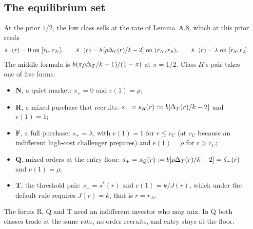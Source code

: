 \subsection{The equilibrium set}

At the prior \(1/2\), the low class sells at the rate of Lemma~A.8, which at this prior reads
\[
\hat s_-(r)=0\ \text{on}\ [r_0,r_N],\qquad \hat s_-(r)=b\,[\rho\Delta_T(r)/k-2]\ \text{on}\ (r_N,r_S),\qquad
\hat s_-(r)=\lambda\ \text{on}\ [r_S,r_2].
\]
The middle formula is \(b(\pi\rho\Delta_T/k-1)/(1-\pi)\) at \(\pi=1/2\). Class \(H\)'s pair takes one of five forms:
\begin{itemize}
\item \textbf{N}, a quiet market: \(s_+=0\) and \(e(1)=\rho\);
\item \textbf{R}, a mixed purchase that recruits: \(s_+=s_R(r):=b[\Delta_T(r)/k-2]\) and \(e(1)=1\);
\item \textbf{F}, a full purchase: \(s_+=\lambda\), with \(e(1)=1\) for \(r\le r_C\) (at \(r_C\) because an
indifferent high-cost challenger prepares) and \(e(1)=\rho\) for \(r>r_C\);
\item \textbf{Q}, mixed orders at the entry floor: \(s_+=s_Q(r):=b[\rho\Delta_T(r)/k-2]=\hat s_-(r)\) and \(e(1)=\rho\);
\item \textbf{T}, the threshold pair: \(s_+=s^*(r)\) and \(e(1)=k/J(r)\), which under the default rule requires
\(J(r)=k\), that is \(r=r_A\).
\end{itemize}
The forms R, Q and T need an indifferent investor who may mix. In Q both classes trade at the same rate, no order
recruits, and entry stays at the floor.

